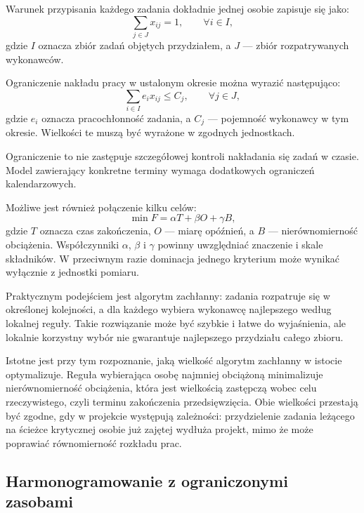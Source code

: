 Warunek przypisania każdego zadania dokładnie jednej osobie zapisuje się jako:
\begin{equation}
    \sum_{j \in J} x_{ij} = 1,
    \qquad \forall i \in I,
    \label{eq:jeden-wykonawca}
\end{equation}
gdzie \(I\) oznacza zbiór zadań objętych przydziałem, a \(J\) --- zbiór rozpatrywanych wykonawców.

Ograniczenie nakładu pracy w ustalonym okresie można wyrazić następująco:
\begin{equation}
    \sum_{i \in I} e_i x_{ij} \leq C_j,
    \qquad \forall j \in J,
    \label{eq:ograniczenie-pojemnosci}
\end{equation}
gdzie \(e_i\) oznacza pracochłonność zadania, a \(C_j\) --- pojemność wykonawcy w tym okresie. Wielkości te muszą być wyrażone w zgodnych jednostkach.

Ograniczenie to nie zastępuje szczegółowej kontroli nakładania się zadań w czasie. Model zawierający konkretne terminy wymaga dodatkowych ograniczeń kalendarzowych.

Możliwe jest również połączenie kilku celów:
\begin{equation}
    \min F = \alpha T + \beta O + \gamma B,
    \label{eq:funkcja-celu}
\end{equation}
gdzie \(T\) oznacza czas zakończenia, \(O\) --- miarę opóźnień, a \(B\) --- nierównomierność obciążenia. Współczynniki \(\alpha\), \(\beta\) i \(\gamma\) powinny uwzględniać znaczenie i skale składników. W przeciwnym razie dominacja jednego kryterium może wynikać wyłącznie z jednostki pomiaru.

Praktycznym podejściem jest algorytm zachłanny: zadania rozpatruje się w określonej kolejności, a dla każdego wybiera wykonawcę najlepszego według lokalnej reguły. Takie rozwiązanie może być szybkie i łatwe do wyjaśnienia, ale lokalnie korzystny wybór nie gwarantuje najlepszego przydziału całego zbioru.

Istotne jest przy tym rozpoznanie, jaką wielkość algorytm zachłanny w istocie optymalizuje. Reguła wybierająca osobę najmniej obciążoną minimalizuje nierównomierność obciążenia, która jest wielkością zastępczą wobec celu rzeczywistego, czyli terminu zakończenia przedsięwzięcia. Obie wielkości przestają być zgodne, gdy w projekcie występują zależności: przydzielenie zadania leżącego na ścieżce krytycznej osobie już zajętej wydłuża projekt, mimo że może poprawiać równomierność rozkładu prac.

\subsection*{Harmonogramowanie z ograniczonymi zasobami}

